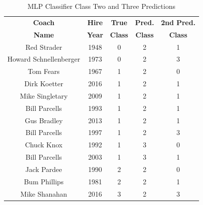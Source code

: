 \documentclass[conference]{IEEEtran}
\begin{document}
\begin{table}[htbp]
\caption{MLP Classifier Class Two and Three Predictions}
\begin{center}
\begin{tabular}{|c||c|c|c|c|}
\hline
\textbf{Coach} & \textbf{Hire} & \textbf{True} & \textbf{Pred.} & \textbf{2nd Pred.} \\
\textbf{Name} & \textbf{Year} & \textbf{Class} & \textbf{Class} & \textbf{Class} \\
\hline
\hline
Red Strader & 1948 & 0 & 2 & 1 \\
\hline
Howard Schnellenberger & 1973 & 0 & 2 & 3 \\
\hline
Tom Fears & 1967 & 1 & 2 & 0 \\
\hline
Dirk Koetter & 2016 & 1 & 2 & 1 \\
\hline
Mike Singletary & 2009 & 1 & 2 & 1 \\
\hline
Bill Parcells & 1993 & 1 & 2 & 1 \\
\hline
Gus Bradley & 2013 & 1 & 2 & 1 \\
\hline
Bill Parcells & 1997 & 1 & 2 & 3 \\
\hline
Chuck Knox & 1992 & 1 & 3 & 0 \\
\hline
Bill Parcells & 2003 & 1 & 3 & 1 \\
\hline
Jack Pardee & 1990 & 2 & 2 & 0 \\
\hline
Bum Phillips & 1981 & 2 & 2 & 1 \\
\hline
Mike Shanahan & 2016 & 3 & 2 & 3 \\
\hline
\end{tabular}
\label{tab15}
\end{center}
\end{table}
\end{document}
